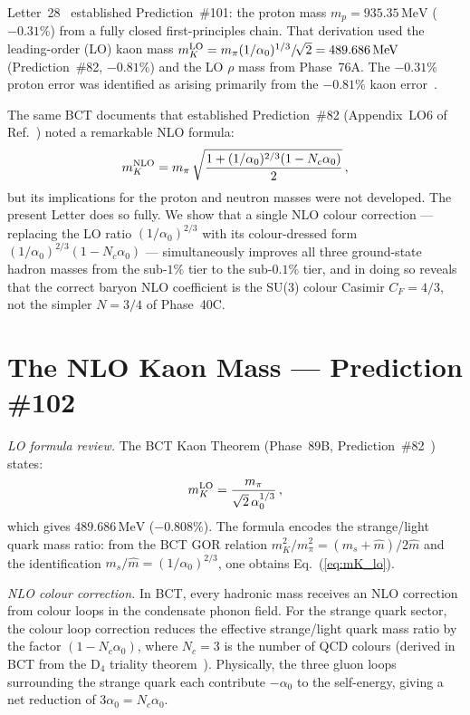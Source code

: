\documentclass[twocolumn,10pt,a4paper]{article}
\begin{document}
Letter~28~\cite{letter28} established Prediction~\#101: the proton mass
$m_p = 935.35\,\mathrm{MeV}$ ($-0.31\%$) from a fully closed first-principles
chain.  That derivation used the leading-order (LO) kaon mass
$m_K^{\rm LO} = m_\pi(1/\alpha_0)^{1/3}/\!\sqrt{2} = 489.686\,\mathrm{MeV}$
(Prediction~\#82, $-0.81\%$) and the LO $\rho$ mass from Phase~76A.  The
$-0.31\%$ proton error was identified as arising primarily from the $-0.81\%$
kaon error~\cite{letter28}.

The same BCT documents that established Prediction~\#82 (Appendix~LO6 of
Ref.~\cite{monograph}) noted a remarkable NLO formula:
\begin{equation}
  \label{eq:mK_nlo}
  m_K^{\rm NLO} = m_\pi\,\sqrt{\frac{1+(1/\alpha_0)^{2/3}(1-N_c\alpha_0)}{2}}\,,
\end{equation}
but its implications for the proton and neutron masses were not developed.
The present Letter does so fully.  We show that a single NLO colour
correction --- replacing the LO ratio $(1/\alpha_0)^{2/3}$ with its
colour-dressed form $(1/\alpha_0)^{2/3}(1-N_c\alpha_0)$ --- simultaneously
improves all three ground-state hadron masses from the sub-$1\%$ tier to
the sub-$0.1\%$ tier, and in doing so reveals that the correct baryon NLO
coefficient is the SU(3) colour Casimir $C_F = 4/3$, not the simpler
$N=3/4$ of Phase~40C.

\section{The NLO Kaon Mass — Prediction \#102}

\textit{LO formula review.}\quad
The BCT Kaon Theorem (Phase~89B, Prediction~\#82~\cite{monograph}) states:
\begin{equation}
  \label{eq:mK_lo}
  m_K^{\rm LO} = \frac{m_\pi}{\sqrt{2}\,\alpha_0^{1/3}}\,,
\end{equation}
which gives $489.686\,\mathrm{MeV}$ ($-0.808\%$).  The formula encodes the
strange/light quark mass ratio: from the BCT GOR relation
$m_K^2 / m_\pi^2 = (m_s+\hat{m})/2\hat{m}$ and the identification
$m_s/\hat{m} = (1/\alpha_0)^{2/3}$, one obtains Eq.~(\ref{eq:mK_lo}).

\textit{NLO colour correction.}\quad
In BCT, every hadronic mass receives an NLO correction from colour loops in the
condensate phonon field.  For the strange quark sector, the colour loop
correction reduces the effective strange/light quark mass ratio by the factor
$(1-N_c\alpha_0)$, where $N_c=3$ is the number of QCD colours (derived in BCT
from the D$_4$ triality theorem~\cite{monograph}).  Physically, the three gluon
loops surrounding the strange quark each contribute $-\alpha_0$ to the
self-energy, giving a net reduction of $3\alpha_0 = N_c\alpha_0$.
\end{document}
